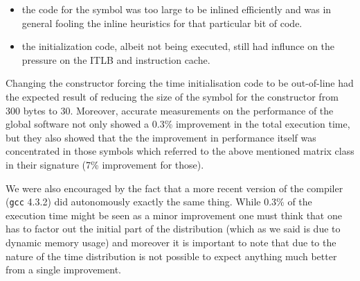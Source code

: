 \documentclass[a4paper]{jpconf}
\begin{document}
\begin{itemize}


\item the code for the symbol was too large to be inlined efficiently and was in general fooling the inline heuristics for that particular bit of code.

\item the initialization code, albeit not being executed, still had influnce on the pressure on the ITLB and instruction cache.
\end{itemize}

Changing the constructor forcing the time initialisation code to be out-of-line had the expected result of reducing the size of the symbol for the constructor from 300 bytes to 30. Moreover, accurate measurements on the performance of the global software not only showed a 0.3\% improvement in the total execution time, but they also showed that the the improvement in performance itself was concentrated in those symbols which referred to the above mentioned matrix class in their signature (7\% improvement for those).


\begin{figure}
\caption{}
\label{}
\begin{center}
\end{center}
\end{figure}



We were also encouraged by the fact that a more recent version of the compiler (\texttt{gcc} 4.3.2) did autonomously exactly the same thing. While 0.3\% of the execution time might be seen as a minor improvement one must think that one has to factor out the initial part of the distribution (which as we said is due to dynamic memory usage) and moreover it is important to note that due to the nature of the time distribution is not possible to expect anything much better from a single improvement.
\end{document}
